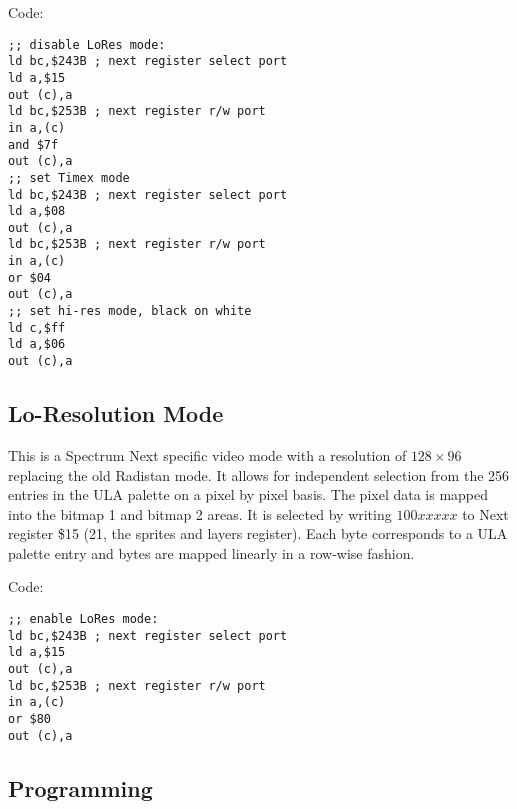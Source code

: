 Code:
\begin{verbatim}
;; disable LoRes mode:
ld bc,$243B ; next register select port
ld a,$15
out (c),a
ld bc,$253B ; next register r/w port
in a,(c)
and $7f
out (c),a
;; set Timex mode
ld bc,$243B ; next register select port
ld a,$08
out (c),a
ld bc,$253B ; next register r/w port
in a,(c)
or $04
out (c),a
;; set hi-res mode, black on white
ld c,$ff
ld a,$06
out (c),a
\end{verbatim}

\subsection{Lo-Resolution Mode}

This is a Spectrum Next specific video mode with a resolution of
$128\times96$ replacing the old Radistan mode.  It allows for
independent selection from the 256 entries in the ULA palette on a
pixel by pixel basis. The pixel data is mapped into the bitmap 1 and
bitmap 2 areas.  It is selected by writing $100xxxxx$ to Next register
\$15 (21, the sprites and layers register).  Each byte corresponds to
a ULA palette entry and bytes are mapped linearly in a row-wise
fashion.

Code:
\begin{verbatim}
;; enable LoRes mode:
ld bc,$243B ; next register select port
ld a,$15
out (c),a
ld bc,$253B ; next register r/w port
in a,(c)
or $80
out (c),a
\end{verbatim}

\subsection{Programming}

